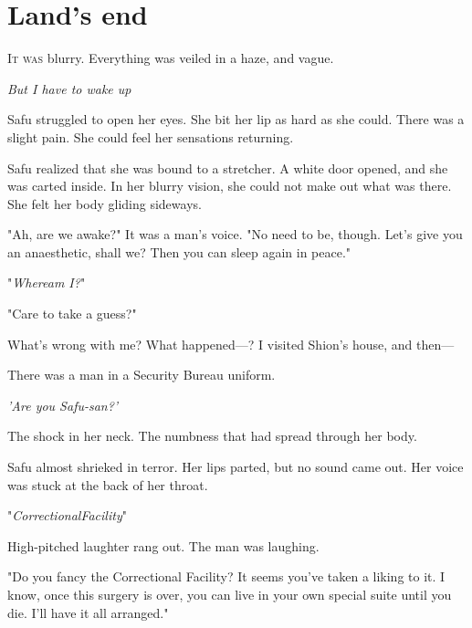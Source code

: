 
\chapter{Land's end}


\lettrine{I}{t was} blurry. Everything was veiled in a haze, and vague.

\emph{But I have to wake up\el }

Safu struggled to open her eyes. She bit her lip as hard as she could.
There was a slight pain. She could feel her sensations returning.

Safu realized that she was bound to a stretcher. A white door opened,
and she was carted inside. In her blurry vision, she could not make out
what was there. She felt her body gliding sideways.

"Ah, are we awake?" It was a man's voice. "No need to be, though. Let's
give you an anaesthetic, shall we? Then you can sleep again in peace."

"\emph{Where\el am I\el ?}"

"Care to take a guess?"

What's wrong with me? What happened---? I visited Shion's house, and then---

There was a man in a Security Bureau uniform.

\emph{'Are you Safu-san?'}

The shock in her neck. The numbness that had spread through her body.

Safu almost shrieked in terror. Her lips parted, but no sound came out.
Her voice was stuck at the back of her throat.

"\emph{Correc\el tional\el Facility\el }"

High-pitched laughter rang out. The man was laughing.

"Do you fancy the Correctional Facility? It seems you've taken a liking
to it. I know, once this surgery is over, you can live in your own
special suite until you die. I'll have it all arranged."


